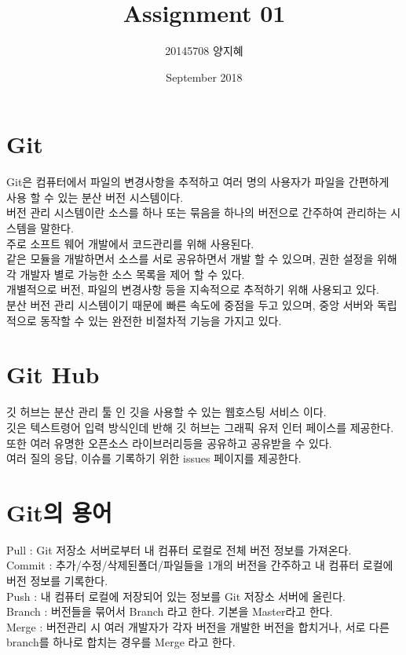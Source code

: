 \documentclass{article}
\title{Assignment 01}
\author{20145708 양지혜}
\date{September 2018}
\begin{document}
\maketitle

\section{Git}
Git은 컴퓨터에서 파일의 변경사항을 추적하고 여러 명의 사용자가 파일을 간편하게 사용 할 수 있는 분산 버전 시스템이다.
\\
버전 관리 시스템이란 소스를 하나 또는 묶음을 하나의 버전으로 간주하여 관리하는 시스템을 말한다.
\\
주로 소프트 웨어 개발에서 코드관리를 위해 사용된다.
\\
같은 모듈을 개발하면서 소스를 서로 공유하면서 개발 할 수 있으며, 권한 설정을 위해 각 개발자 별로 가능한 소스 목록을 제어 할 수 있다.
\\
개별적으로 버전, 파일의 변경사항 등을 지속적으로 추적하기 위해 사용되고 있다.
\\
분산 버전 관리 시스템이기 때문에 빠른 속도에 중점을 두고 있으며, 중앙 서버와 독립적으로 동작할 수 있는 완전한 비절차적 기능을 가지고 있다.

\section{Git Hub}

깃 허브는 분산 관리 툴 인 깃을 사용할 수 있는 웹호스팅 서비스 이다.
\\
깃은 텍스트령어 입력 방식인데 반해 깃 허브는 그래픽 유저 인터 페이스를 제공한다. 
\\
또한 여러 유명한 오픈소스 라이브러리등을 공유하고 공유받을 수 있다.
\\
여러 질의 응답, 이슈를 기록하기 위한 issues 페이지를 제공한다. 
\\
\section{Git의 용어}

Pull : Git 저장소 서버로부터 내 컴퓨터 로컬로 전체 버전 정보를 가져온다.
\\
Commit : 추가/수정/삭제된폴더/파일들을 1개의 버전을 간주하고 내 컴퓨터 로컬에 버전 정보를 기록한다.
\\
Push : 내 컴퓨터 로컬에 저장되어 있는 정보를 Git 저장소 서버에 올린다.
\\
Branch : 버전들을 묶어서 Branch 라고 한다. 기본을 Master라고 한다.
\\
Merge : 버전관리 시 여러 개발자가 각자 버전을 개발한 버전을 합치거나, 서로 다른 branch를 하나로 합치는 경우를 Merge 라고 한다.
\end{document}
